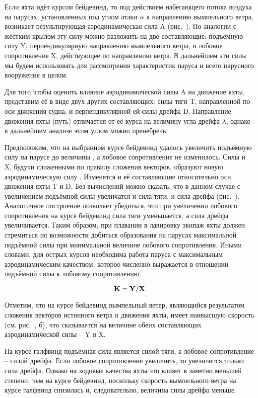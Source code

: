 Если яхта идёт курсом бейдевинд, то под действием набегающего потока воздуха на парусах, установленных под углом атаки $\alpha$ к направлению вымпельного ветра, возникает результирующая аэродинамическая сила \ve A (рис.~). По аналогии с жёстким крылом эту силу можно разложить на две составляющие: подъёмную силу \ve Y, перпендикулярную направлению вымпельного ветра, и лобовое сопротивление \ve X, действующее по направлению ветра. В дальнейшем эти силы мы будем использовать для рассмотрения характеристик паруса и всего парусного вооружения в целом. 

Для того чтобы оценить влияние аэродинамической силы \ve A на движение яхты, представим её в виде двух других составляющих: силы тяги \ve T, направленной по оси движения судна, и перпендикулярной ей силы дрейфа \ve D. Направление движения яхты (путь) отличается от её курса на величину угла дрейфа $\lambda$, однако в дальнейшем анализе этим углом можно пренебречь. 

Предположим, что на выбранном курсе бейдевинд удалось увеличить подъёмную силу на парусе до величины , а лобовое сопротивление не изменилось. Силы  и \ve X, будучи сложенными по правилу сложения векторов, образуют новую аэродинамическую силу . Изменятся и её составляющие относительно оси движения яхты \ve T и \ve D. Без вычислений можно сказать, что в данном случае с увеличением подъёмной силы увеличатся и сила тяги, и сила дрейфа (рис.~). Аналогичное построение позволяет убедиться, что при увеличении лобового сопротивления на курсе бейдевинд сила тяги уменьшается, а сила дрейфа увеличивается. Таким образом, при плавании в лавировку экипаж яхты должен стремиться по возможности добиться образования на парусах максимальной подъёмной силы при минимальной величине лобового сопротивления. Иными словами, для острых курсов необходима работа паруса с максимальным аэродинамическим качеством, которое численно выражается в отношении подъёмной силы к лобовому сопротивлению. 

\begin{equation}
\mathbf{K} = \mathbf{Y} / \mathbf{X}
\end{equation}

Отметим, что на курсе бейдевинд вымпельный ветер, являющийся результатом сложения векторов истинного ветра и движения яхты, имеет наивысшую скорость  (см. рис.~, \textit{б}), что сказывается на величине обеих составляющих аэродинамической силы \--- \ve Y и \ve X.

На курсе галфвинд подъёмная сила является силой тяги, а лобовое сопротивление \--- силой дрейфа. Если лобовое сопротивление увеличить, то увеличится только сила дрейфа. Однако на ходовые качества яхты это влияет в заметно меньшей степени, чем на курсе бейдевинд, поскольку скорость вымпельного ветра на курсе галфвинд снизилась и, следовательно, величина силы дрейфа меньше.

